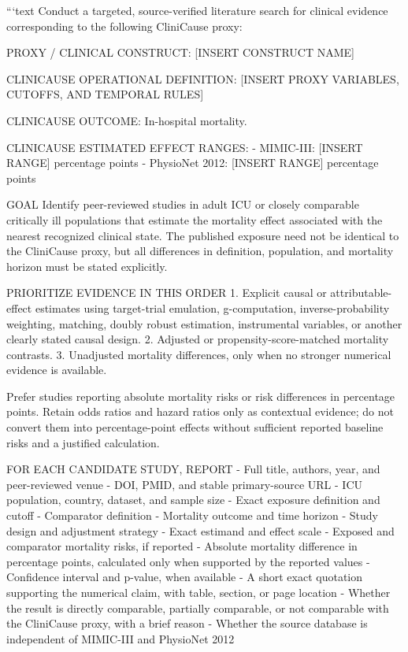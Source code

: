 \documentclass[letterpaper,10pt]{article}
\begin{document}
```text
Conduct a targeted, source-verified literature search for clinical evidence
corresponding to the following CliniCause proxy:

PROXY / CLINICAL CONSTRUCT:
[INSERT CONSTRUCT NAME]

CLINICAUSE OPERATIONAL DEFINITION:
[INSERT PROXY VARIABLES, CUTOFFS, AND TEMPORAL RULES]

CLINICAUSE OUTCOME:
In-hospital mortality.

CLINICAUSE ESTIMATED EFFECT RANGES:
- MIMIC-III: [INSERT RANGE] percentage points
- PhysioNet 2012: [INSERT RANGE] percentage points

GOAL
Identify peer-reviewed studies in adult ICU or closely comparable critically
ill populations that estimate the mortality effect associated with the nearest
recognized clinical state. The published exposure need not be identical to the
CliniCause proxy, but all differences in definition, population, and mortality
horizon must be stated explicitly.

PRIORITIZE EVIDENCE IN THIS ORDER
1. Explicit causal or attributable-effect estimates using target-trial
   emulation, g-computation, inverse-probability weighting, matching,
   doubly robust estimation, instrumental variables, or another clearly
   stated causal design.
2. Adjusted or propensity-score-matched mortality contrasts.
3. Unadjusted mortality differences, only when no stronger numerical evidence
   is available.

Prefer studies reporting absolute mortality risks or risk differences in
percentage points. Retain odds ratios and hazard ratios only as contextual
evidence; do not convert them into percentage-point effects without sufficient
reported baseline risks and a justified calculation.

FOR EACH CANDIDATE STUDY, REPORT
- Full title, authors, year, and peer-reviewed venue
- DOI, PMID, and stable primary-source URL
- ICU population, country, dataset, and sample size
- Exact exposure definition and cutoff
- Comparator definition
- Mortality outcome and time horizon
- Study design and adjustment strategy
- Exact estimand and effect scale
- Exposed and comparator mortality risks, if reported
- Absolute mortality difference in percentage points, calculated only when
  supported by the reported values
- Confidence interval and p-value, when available
- A short exact quotation supporting the numerical claim, with table, section,
  or page location
- Whether the result is directly comparable, partially comparable, or not
  comparable with the CliniCause proxy, with a brief reason
- Whether the source database is independent of MIMIC-III and PhysioNet 2012
\end{document}
